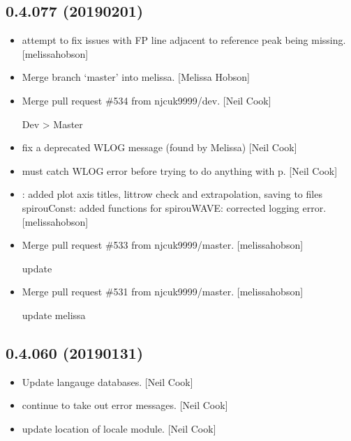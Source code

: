 \documentclass[a4paper,10pt,english]{report}
\begin{document}
\subsection{0.4.077 (2019\sphinxhyphen{}02\sphinxhyphen{}01)}
\label{\detokenize{misc/changelog:id219}}\begin{itemize}
\item {} 
 attempt to fix issues with FP line adjacent to
reference peak being missing. {[}melissa\sphinxhyphen{}hobson{]}

\item {} 
Merge branch ‘master’ into melissa. {[}Melissa Hobson{]}

\item {} 
Merge pull request \#534 from njcuk9999/dev. {[}Neil Cook{]}

Dev \textendash{}\textgreater{} Master

\item {} 
 \sphinxhyphen{} fix a deprecated WLOG message (found by Melissa) {[}Neil
Cook{]}

\item {} 
 \sphinxhyphen{} must catch WLOG error before trying to do anything with
p. {[}Neil Cook{]}

\item {} 
: added plot axis titles, littrow check and
extrapolation, saving to files spirouConst: added functions for
 spirouWAVE: corrected logging error. {[}melissa\sphinxhyphen{}hobson{]}

\item {} 
Merge pull request \#533 from njcuk9999/master. {[}melissa\sphinxhyphen{}hobson{]}

update

\item {} 
Merge pull request \#531 from njcuk9999/master. {[}melissa\sphinxhyphen{}hobson{]}

update melissa

\end{itemize}


\subsection{0.4.060 (2019\sphinxhyphen{}01\sphinxhyphen{}31)}
\label{\detokenize{misc/changelog:id220}}\begin{itemize}
\item {} 
Update langauge databases. {[}Neil Cook{]}

\item {} 
 \sphinxhyphen{} continue to take out error messages. {[}Neil Cook{]}

\item {} 
 \sphinxhyphen{} update location of locale module. {[}Neil Cook{]}

\end{itemize}
\end{document}
